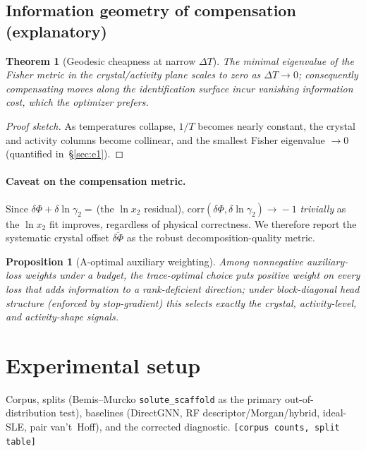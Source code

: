 \documentclass[11pt]{article}
\newtheorem{theorem}{Theorem}
\newtheorem{proposition}{Proposition}
\newcommand{\pending}[1][?]{{\color{red}\texttt{[#1]}}}
\newcommand{\lnx}{\ln x_2}
\newcommand{\Phicry}{\Phi}
\newcommand{\lng}{\ln\gamma_2}
\begin{document}
\subsection{Information geometry of compensation (explanatory)}
\begin{theorem}[Geodesic cheapness at narrow $\Delta T$]\label{thm:geom}
The minimal eigenvalue of the Fisher metric in the crystal/activity plane scales
to zero as $\Delta T\to0$; consequently compensating moves along the
identification surface incur vanishing information cost, which the optimizer
prefers.
\end{theorem}
\begin{proof}[Proof sketch]
As temperatures collapse, $1/T$ becomes nearly constant, the crystal and activity
columns become collinear, and the smallest Fisher eigenvalue $\to0$
(quantified in~\S\ref{sec:e1}).
\end{proof}

\paragraph{Caveat on the compensation metric.} Since
$\delta\Phicry+\delta\lng=\,$(the $\lnx$ residual),
$\mathrm{corr}(\delta\Phicry,\delta\lng)\!\to\!-1$ \emph{trivially} as the
$\lnx$ fit improves, regardless of physical correctness. We therefore report the
systematic crystal offset $\overline{\delta\Phicry}$ as the robust
decomposition-quality metric.

\begin{proposition}[A-optimal auxiliary weighting]\label{prop:aopt}
Among nonnegative auxiliary-loss weights under a budget, the trace-optimal choice
puts positive weight on every loss that adds information to a rank-deficient
direction; under block-diagonal head structure (enforced by stop-gradient) this
selects exactly the crystal, activity-level, and activity-shape signals.
\end{proposition}

\section{Experimental setup}
\label{sec:exp-setup}
Corpus, splits (Bemis--Murcko \texttt{solute\_scaffold} as the primary
out-of-distribution test), baselines (DirectGNN, RF descriptor/Morgan/hybrid,
ideal-SLE, pair van't~Hoff), and the corrected diagnostic. \pending[corpus
counts, split table]
\end{document}
